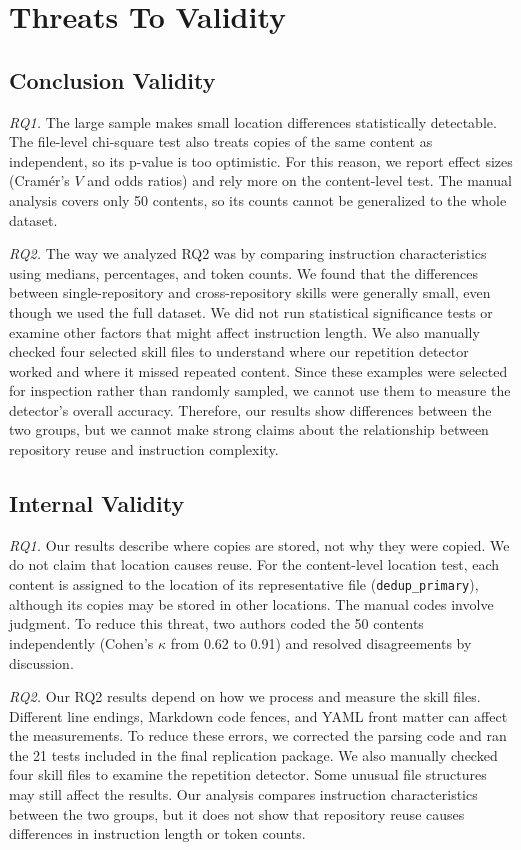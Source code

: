 \documentclass[sigconf,review]{acmart}
\begin{document}
\label{Section:Discussion}

\section{Threats To Validity}
\label{Section:Threats}
\subsection{Conclusion Validity}
\textit{RQ1.}
The large sample makes small location differences statistically
detectable.
The file-level chi-square test also treats copies of the same content as independent, so its p-value is too optimistic.
For this reason, we report effect sizes (Cram\'er's $V$ and odds ratios) and rely more on the content-level test.
The manual analysis covers only 50 contents, so its counts cannot be generalized to the whole dataset.


\textit{RQ2.}
The way we analyzed RQ2 was by comparing instruction
characteristics using medians, percentages, and token counts.
We found that the differences between single-repository
and cross-repository skills were generally small, even
though we used the full dataset. We did not run statistical
significance tests or examine other factors that might
affect instruction length. We also manually checked four selected skill files to
understand where our repetition detector worked and where
it missed repeated content. Since these examples were
selected for inspection rather than randomly sampled,
we cannot use them to measure the detector's overall
accuracy.
Therefore, our results show differences between the two
groups, but we cannot make strong claims about the
relationship between repository reuse and instruction
complexity.

\subsection{Internal Validity}
\textit{RQ1.}
Our results describe where copies are stored, not why they were copied.
We do not claim that location causes reuse.
For the content-level location test, each content is assigned to the location of its representative file (\texttt{dedup\_primary}), although its copies may be stored in other locations.
The manual codes involve judgment.
To reduce this threat, two authors coded the 50 contents independently (Cohen's $\kappa$ from 0.62 to 0.91) and resolved disagreements by discussion.


\textit{RQ2.}
Our RQ2 results depend on how we process and measure
the skill files. Different line endings, Markdown code
fences, and YAML front matter can affect the measurements.
To reduce these errors, we corrected the parsing code
and ran the 21 tests included in the final replication package. We also manually checked four skill files to examine the repetition detector.
Some unusual file structures may still affect the results.
Our analysis compares instruction characteristics between
the two groups, but it does not show that repository reuse
causes differences in instruction length or token counts.
\end{document}
